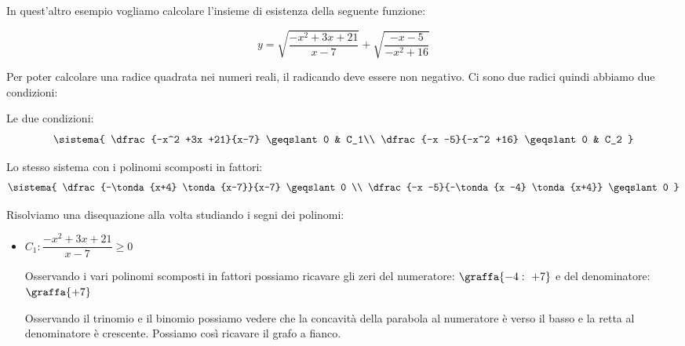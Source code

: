 \begin{esempio}{}{}
 
In quest'altro esempio vogliamo calcolare l'insieme di esistenza della 
seguente funzione:

\[y = \sqrt{\dfrac{-x^2 +3x +21}{x-7}} + \sqrt{\dfrac{-x -5}{-x^2 +16}}
\]

Per poter calcolare una radice quadrata nei numeri reali, il radicando deve 
essere non negativo. Ci sono due radici quindi abbiamo due condizioni:

\begin{minipage}{.49 \linewidth}
Le due condizioni:
 \[\sistema{
    \dfrac{-x^2 +3x +21}{x-7} \geqslant 0 & C_1\\
    \dfrac{-x -5}{-x^2 +16} \geqslant 0 & C_2
  }
\]
\end{minipage}
\begin{minipage}{.49 \linewidth}
Lo stesso sistema con i polinomi scomposti in fattori:
\[\sistema{
    \dfrac{-\tonda{x+4} \tonda{x-7}}{x-7} \geqslant 0 \\
    \dfrac{-x -5}{-\tonda{x -4} \tonda{x+4}} \geqslant 0
  }
\]
\end{minipage}


Risolviamo una disequazione alla volta studiando i segni dei polinomi:

\begin{itemize}
 \item \(C_1: \dfrac{-x^2 +3x +21}{x-7} \geqslant 0\)

Osservando i vari polinomi scomposti in fattori possiamo ricavare gli zeri 
del numeratore: \(\graffa{-4:~+7}\) e del denominatore: \(\graffa{+7}\)

\begin{minipage}{.49\textwidth}
Osservando il trinomio e il binomio possiamo vedere che la concavità della 
parabola al numeratore è verso il basso e la retta al 
denominatore è crescente. Possiamo così ricavare il grafo a fianco.
\end{minipage}
\hfill
\begin{minipage}{.49\textwidth}
\begin{center} \segnosistemaba \end{center}
\end{minipage}



\end{itemize}
\end{esempio}

